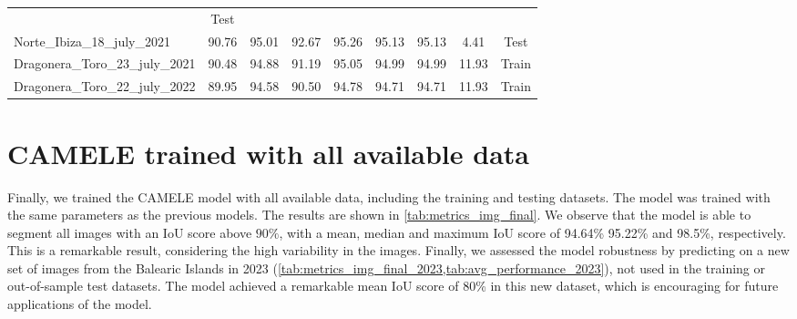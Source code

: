 \begin{table}[H]
{\begin{tabular}{lcccccccc}
                                                   & {\color[HTML]{fc8d62}
                    Test}
            \\
            Norte\_Ibiza\_18\_july\_2021           & 90.76
                                                   & 95.01
                                                   & 92.67
                                                   & 95.26
                                                   & 95.13
                                                   & 95.13
                                                   & 4.41
                                                   & {\color[HTML]{fc8d62}
                    Test}
            \\
            Dragonera\_Toro\_23\_july\_2021        & 90.48
                                                   & 94.88
                                                   & 91.19
                                                   & 95.05
                                                   & 94.99
                                                   & 94.99
                                                   & 11.93
                                                   & {\color[HTML]{66c2a5}
                    Train}
            \\
            Dragonera\_Toro\_22\_july\_2022        & 89.95
                                                   & 94.58
                                                   & 90.50
                                                   & 94.78
                                                   & 94.71
                                                   & 94.71
                                                   & 11.93
                                                   & {\color[HTML]{66c2a5}
            Train}                                                         \\
            \bottomrule
        \end{tabular}%
    }
\end{table}

\section{CAMELE trained with all available data}\label{app:final_model}

Finally, we trained the CAMELE model with all available data, including the
training and testing datasets. The model was trained with the same parameters
as the previous models. The results are shown in
\cref{tab:metrics_img_final}.
We observe that the model is able to segment all images with an IoU score above
$90\%$, with a mean, median and maximum IoU score of 94.64\% 95.22\% and
98.5\%, respectively. This is a remarkable result, considering the high
variability in the images. Finally, we assessed the model
robustness by predicting on a new set of images from the Balearic Islands in
2023 (\cref{tab:metrics_img_final_2023,tab:avg_performance_2023}), not used in
the training or out-of-sample test datasets. The model achieved a remarkable
mean IoU score of 80\% in this new dataset, which is encouraging for future
applications of the model.

